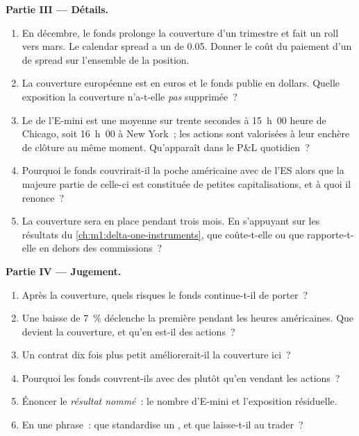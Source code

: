 \begin{problem}
\medskip\noindent\textbf{Partie III --- Détails.}
\begin{enumerate}[resume]
\item En décembre, le fonds prolonge la couverture d'un trimestre et fait un roll
vers mars. Le calendar spread a un  de 0.05. Donner le coût du paiement d'un 
de spread sur l'ensemble de la position.
\item La couverture européenne est en euros et le fonds publie en dollars. Quelle
exposition la couverture n'a-t-elle \emph{pas} supprimée~?
\item Le  de l'E-mini est une moyenne sur trente secondes à
15~h~00 heure de Chicago, soit 16~h~00 à New York~; les actions sont valorisées à leur enchère
de clôture au même moment. Qu'apparaît dans le P\&L quotidien~?
\item Pourquoi le fonds couvrirait-il la poche américaine avec de l'ES alors que la majeure
partie de celle-ci est constituée de petites capitalisations, et à quoi il renonce~?
\item La couverture sera en place pendant trois mois. En s'appuyant sur les résultats
du \cref{ch:m1:delta-one-instruments}, que coûte-t-elle ou que rapporte-t-elle en dehors
des commissions~?
\end{enumerate}

\medskip\noindent\textbf{Partie IV --- Jugement.}
\begin{enumerate}[resume]
\item Après la couverture, quels risques le fonds continue-t-il de porter~?
\item Une baisse de 7~\% déclenche la première  pendant les heures
américaines. Que devient la couverture, et qu'en est-il des actions~?
\item Un contrat dix fois plus petit améliorerait-il la couverture ici~?
\item Pourquoi les fonds couvrent-ils avec des  plutôt qu'en vendant les actions~?
\item Énoncer le \emph{résultat nommé}~: le nombre d'E-mini et
l'exposition résiduelle.
\item En une phrase~: que standardise un , et que
laisse-t-il au trader~?
\end{enumerate}
\end{problem}

